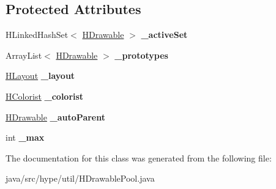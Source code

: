 \subsection*{Protected Attributes}
\begin{DoxyCompactItemize}
\item 
\hypertarget{classhype_1_1util_1_1_h_drawable_pool_a4424f26db4515c01f37ff844b106656a}{H\-Linked\-Hash\-Set$<$ \hyperlink{classhype_1_1drawable_1_1_h_drawable}{H\-Drawable} $>$ {\bfseries \-\_\-active\-Set}}\label{classhype_1_1util_1_1_h_drawable_pool_a4424f26db4515c01f37ff844b106656a}

\item 
\hypertarget{classhype_1_1util_1_1_h_drawable_pool_a7146e4d423fde5a2a163c7d2840790bc}{Array\-List$<$ \hyperlink{classhype_1_1drawable_1_1_h_drawable}{H\-Drawable} $>$ {\bfseries \-\_\-prototypes}}\label{classhype_1_1util_1_1_h_drawable_pool_a7146e4d423fde5a2a163c7d2840790bc}

\item 
\hypertarget{classhype_1_1util_1_1_h_drawable_pool_a97dc79fcad128a6fbebfebbe03098e59}{\hyperlink{interfacehype_1_1layout_1_1_h_layout}{H\-Layout} {\bfseries \-\_\-layout}}\label{classhype_1_1util_1_1_h_drawable_pool_a97dc79fcad128a6fbebfebbe03098e59}

\item 
\hypertarget{classhype_1_1util_1_1_h_drawable_pool_a43ec5c3cdb73cb7f19f67c71d714fae7}{\hyperlink{interfacehype_1_1colorist_1_1_h_colorist}{H\-Colorist} {\bfseries \-\_\-colorist}}\label{classhype_1_1util_1_1_h_drawable_pool_a43ec5c3cdb73cb7f19f67c71d714fae7}

\item 
\hypertarget{classhype_1_1util_1_1_h_drawable_pool_ae4641976db634b01d779855c7781fcfe}{\hyperlink{classhype_1_1drawable_1_1_h_drawable}{H\-Drawable} {\bfseries \-\_\-auto\-Parent}}\label{classhype_1_1util_1_1_h_drawable_pool_ae4641976db634b01d779855c7781fcfe}

\item 
\hypertarget{classhype_1_1util_1_1_h_drawable_pool_affe9b7ec7bb037a7a6dc94a03e0d0d34}{int {\bfseries \-\_\-max}}\label{classhype_1_1util_1_1_h_drawable_pool_affe9b7ec7bb037a7a6dc94a03e0d0d34}

\end{DoxyCompactItemize}


The documentation for this class was generated from the following file\-:\begin{DoxyCompactItemize}
\item 
java/src/hype/util/H\-Drawable\-Pool.\-java\end{DoxyCompactItemize}
